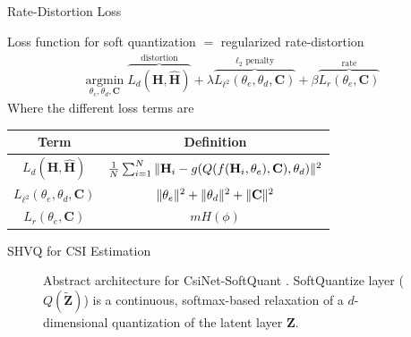 \documentclass{beamer}
\begin{document}
  \begin{frame}{Rate-Distortion Loss}
    \footnotesize{
    Loss function for soft quantization $=$ regularized rate-distortion
    \begin{align}
      \underset{\theta_e, \theta_d, \mathbf C}{\text{argmin}}\; \overbrace{L_{d}(\mathbf H, \hat {\mathbf H})}^{\text{distortion}} + \lambda \overbrace{L_{\ell^2}(\theta_e, \theta_d, \mathbf C)}^{\ell_2\text{ penalty}} + \beta \overbrace{L_{r}(\theta_e,\mathbf C)}^{\text{rate}}
    \end{align} 
    Where the different loss terms are

      \begin{table}[]
      \centering
      \begin{tabular}{c|c}
      \toprule
      \textbf{Term} & \textbf{Definition} \\ \midrule
       $ L_{d}(\mathbf H, \hat {\mathbf H}) $ & $ \frac 1N \sum_{i=1}^N\Arrowvert \mathbf H_i - g(Q(f(\mathbf H_i, \theta_e), \mathbf C), \theta_d) \Arrowvert^2 $ \\ \hline
       $ L_{\ell^2}(\theta_e, \theta_d, \mathbf C) $ & $ \Arrowvert\theta_e\Arrowvert^2+\Arrowvert\theta_d\Arrowvert^2+\Arrowvert \mathbf C \Arrowvert^2 $ \\ \hline
       $ L_{r}(\theta_e, \mathbf C) $ & $m H(\phi)$  \\ \bottomrule
      \end{tabular}
      \end{table}
    }
  \end{frame}

  \begin{frame}{SHVQ for CSI Estimation}
    \begin{figure}[!hbtp]
    \centering
    {
      \fontsize{6pt}{8pt}
      \def\svgwidth{0.8\columnwidth}
      
    }
    \caption{Abstract architecture for CsiNet-SoftQuant \cite{ref:Yang2019DeepCMC}. SoftQuantize layer ($Q(\tilde{\mathbf Z})$) is a continuous, softmax-based relaxation of a $d$-dimensional quantization of the latent layer $\mathbf Z$.}
    \label{fig:csinet_quant}
    \end{figure}
  \end{frame}

\end{document}
